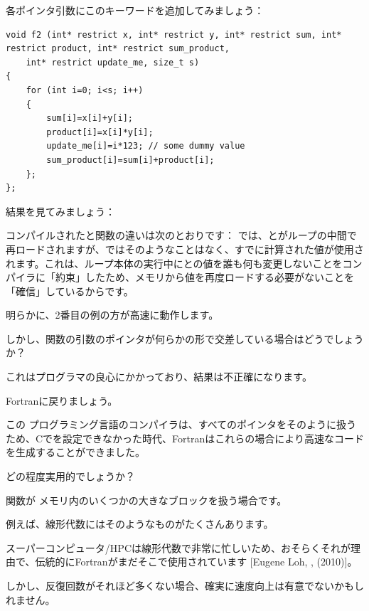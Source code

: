 各ポインタ引数にこのキーワードを追加してみましょう：

\begin{lstlisting}[style=customc]
void f2 (int* restrict x, int* restrict y, int* restrict sum, int* restrict product, int* restrict sum_product, 
	int* restrict update_me, size_t s)
{
	for (int i=0; i<s; i++)
	{
		sum[i]=x[i]+y[i];
		product[i]=x[i]*y[i];
		update_me[i]=i*123; // some dummy value
		sum_product[i]=sum[i]+product[i];	
	};
};
\end{lstlisting}

結果を見てみましょう：





コンパイルされたと関数の違いは次のとおりです：
では、とがループの中間で再ロードされますが、ではそのようなことはなく、すでに計算された値が使用されます。これは、ループ本体の実行中にとの値を誰も何も変更しないことをコンパイラに「約束」したため、メモリから値を再度ロードする必要がないことを「確信」しているからです。

明らかに、2番目の例の方が高速に動作します。

しかし、関数の引数のポインタが何らかの形で交差している場合はどうでしょうか？

これはプログラマの良心にかかっており、結果は不正確になります。

Fortranに戻りましょう。

この プログラミング言語のコンパイラは、すべてのポインタをそのように扱うため、Cでを設定できなかった時代、Fortranはこれらの場合により高速なコードを生成することができました。

どの程度実用的でしょうか？

関数が メモリ内のいくつかの大きなブロックを扱う場合です。

例えば、線形代数にはそのようなものがたくさんあります。

スーパーコンピュータ/\ac{HPC}は線形代数で非常に忙しいため、おそらくそれが理由で、伝統的にFortranがまだそこで使用されています [Eugene Loh, , (2010)]。

しかし、反復回数がそれほど多くない場合、確実に速度向上は有意でないかもしれません。